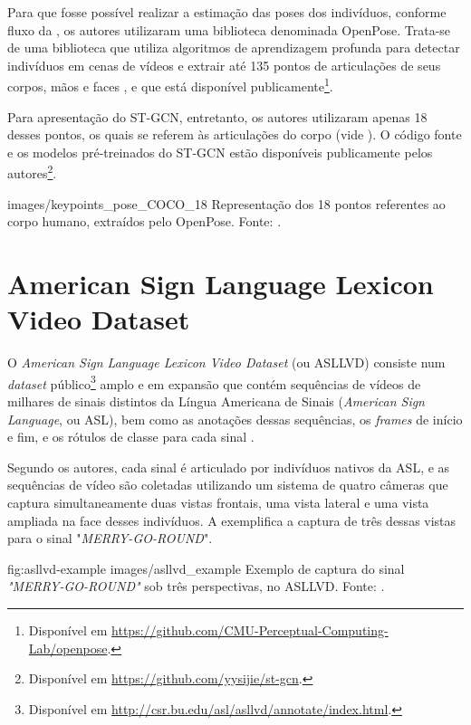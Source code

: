 Para que fosse possível realizar a estimação das poses dos indivíduos, conforme fluxo da , os autores utilizaram uma biblioteca denominada OpenPose. Trata-se de uma biblioteca que utiliza algoritmos de aprendizagem profunda para detectar indivíduos em cenas de vídeos e extrair até 135 pontos de articulações de seus corpos, mãos e faces \cite{cao-realtime-2017, simon-hand-2017, wei-cpm-2016}, e que está disponível publicamente\footnote{
    Disponível em \url{https://github.com/CMU-Perceptual-Computing-Lab/openpose}.
}.

Para apresentação do ST-GCN, entretanto, os autores utilizaram apenas 18 desses pontos, os quais se referem às articulações do corpo (vide ). O código fonte e os modelos pré-treinados do ST-GCN estão disponíveis publicamente pelos autores\footnote{
    Disponível em \url{https://github.com/yysijie/st-gcn}.
}.

    {images/keypoints_pose_COCO_18}
    {Representação dos 18 pontos referentes ao corpo humano, extraídos pelo OpenPose. Fonte: \cite{openpose-output-2018}.}




\section{American Sign Language Lexicon Video Dataset} %

O \textit{American Sign Language Lexicon Video Dataset} (ou ASLLVD) consiste num \textit{dataset} público\footnote{
    Disponível em \url{http://csr.bu.edu/asl/asllvd/annotate/index.html}.
} amplo e em expansão que contém sequências de vídeos de milhares de sinais distintos da Língua Americana de Sinais (\textit{American Sign Language}, ou ASL), bem como as anotações dessas sequências, os \textit{frames} de início e fim, e os rótulos de classe para cada sinal \cite{athitsos-asllvd-2008, neidle-2012, vloger-2012}.

Segundo os autores, cada sinal é articulado por indivíduos nativos da ASL, e as sequências de vídeo são coletadas utilizando um sistema de quatro câmeras que captura simultaneamente duas vistas frontais, uma vista lateral e uma vista ampliada na face desses indivíduos. A  exemplifica a captura de três dessas vistas para o sinal "\textit{MERRY-GO-ROUND}".

\image
    {fig:asllvd-example}
    {images/asllvd_example}
    {Exemplo de captura do sinal \textit{"MERRY-GO-ROUND"} sob três perspectivas, no ASLLVD. Fonte:  \cite[p. 2]{athitsos-asllvd-2008}.}

